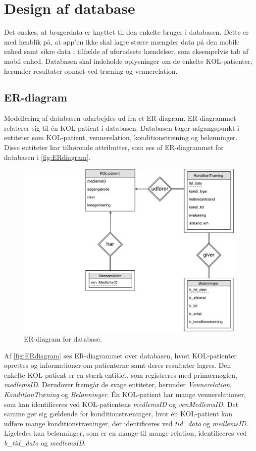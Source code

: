 \newpage
\section{Design af database} \label{sec:ER}
Det ønskes, at brugerdata er knyttet til den enkelte bruger i databasen. Dette er med henblik på, at app'en ikke skal lagre større mængder data på den mobile enhed samt sikre data i tilfælde af uforudsete hændelser, som eksempelvis tab af mobil enhed. Databasen skal indeholde oplysninger om de enkelte KOL-patienter, herunder resultater opnået ved træning og vennerelation. 

\subsection{ER-diagram}
Modellering af databasen udarbejdes ud fra et ER-diagram. ER-diagrammet relaterer sig til én KOL-patient i databasen. Databasen tager udgangspunkt i entiteter som KOL-patient, vennerelation, konditionstræning og belønninger. Disse entiteter har tilhørende attributter, som ses af ER-diagrammet for databasen i \autoref{fig:ERdiagram}.

\begin{figure} [H]
\centering
\includegraphics[width=1\textwidth]{figures/Aktivitetsdiagram/ERdiagram}
\caption{ER-diagram for database.}
\label{fig:ERdiagram}
\end{figure} 

\noindent
Af \autoref{fig:ERdiagram} ses ER-diagrammet over databasen, hvori KOL-patienter oprettes og informationer om patienterne samt deres resultater lagres. Den enkelte KOL-patient er en stærk entitiet, som registreres med primærnøglen, \textit{medlemsID}. Derudover fremgår de svage entiteter, herunder \textit{Vennerelation}, \textit{KonditionTræning} og \textit{Belønninger}. Én KOL-patient har mange vennerelationer, som kan identificeres ved KOL-patientens \textit{medlemsID} og \textit{venMedlemsID}. Det samme gør sig gældende for konditionstræninger, hvor én KOL-patient kan udføre mange konditionstræninger, der identificeres ved \textit{tid\_dato} og \textit{medlemsID}. Ligeledes kan belønninger, som er en mange til mange relation, identificeres ved \textit{b\_tid\_dato} og \textit{medlemsID}.

